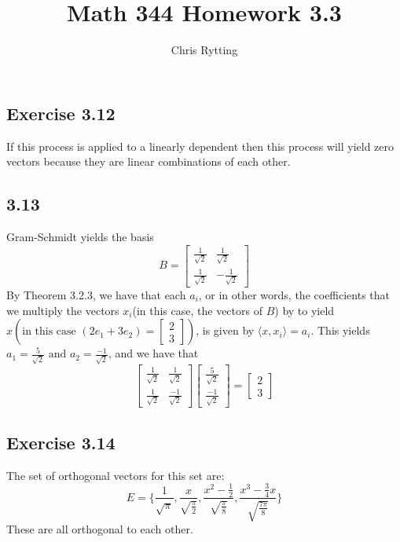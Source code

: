 \documentclass[letterpaper,12pt]{article}
\theoremstyle{definition}
\begin{document}
\title{Math 344 Homework 3.3}
\author{Chris Rytting}
\maketitle



\subsection*{Exercise 3.12}
If this process is applied to a linearly dependent then this process will yield zero vectors because they are linear combinations of each other. 

\subsection*{3.13}
Gram-Schmidt yields the basis
\[B=
\begin{bmatrix}
    \frac{1}{\sqrt{2}}&\frac{1}{\sqrt{2}}\\
    \frac{1}{\sqrt{2}}&-\frac{1}{\sqrt{2}}
\end{bmatrix}
\]
By Theorem 3.2.3, we have that each $a_i$, or in other words, the coefficients that we multiply the vectors $x_i$(in this case, the vectors of $B$) by to yield $x (\text{in this case }(2e_1 + 3e_2) = 
\begin{bmatrix}
    2\\3
\end{bmatrix})$, is given by $\langle x,x_i \rangle = a_i$.
This yields $a_1 = \frac{5}{\sqrt{2}} \text{ and } a_2 = \frac{-1}{\sqrt{2}}$, and we have that
\[
\begin{bmatrix}
    \frac{1}{\sqrt{2}} & \frac{1}{\sqrt{2}}\\
    \frac{1}{\sqrt{2}} & \frac{-1}{\sqrt{2}}
\end{bmatrix}
\begin{bmatrix}
    \frac{5}{\sqrt{2}}\\
    \frac{-1}{\sqrt{2}} 
\end{bmatrix}
=
\begin{bmatrix}
    2\\
    3
\end{bmatrix}
\]




\subsection*{Exercise 3.14}
The set of orthogonal vectors for this set are:
\[E=\{\frac{1}{\sqrt{\pi}},\frac{x}{\sqrt{\frac{\pi}{2}}},\frac{x^2-\frac{1}{2}}{\sqrt{\frac{\pi}{8}}},\frac{x^3-\frac{3}{4}x}{\sqrt{\frac{7\pi}{8}}}\}\]
These are all orthogonal to each other.
\end{document}
